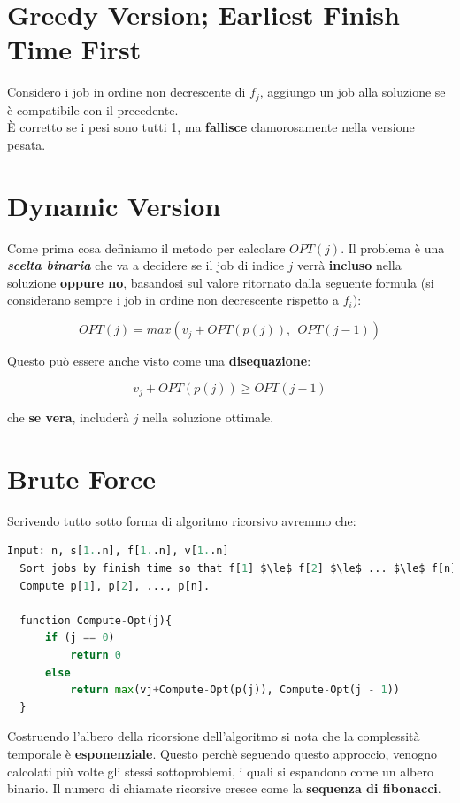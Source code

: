 \section{Greedy Version; Earliest Finish Time First}

Considero i job in ordine non decrescente di $f_j$, aggiungo un job
alla soluzione se è compatibile con il precedente.\\
È corretto se i pesi sono tutti 1, ma \textbf{fallisce} clamorosamente
nella versione pesata.

\section{Dynamic Version}

Come prima cosa definiamo il metodo per calcolare $OPT(j)$. Il
problema è una \textbf{\emph{scelta binaria}} che va a decidere se il
job di indice $j$ verrà \textbf{incluso} nella soluzione
\textbf{oppure no}, basandosi sul valore ritornato dalla seguente
formula (si considerano sempre i job in ordine non decrescente rispetto
a $f_i$):

$$
      OPT(j) = max(v_j + OPT(p(j)), \ \ OPT(j-1))
$$

Questo può essere anche visto come una \textbf{disequazione}:

$$
      v_j + OPT(p(j)) \geq OPT(j-1)
$$

che \textbf{se vera}, includerà $j$ nella soluzione ottimale.


\section{Brute Force}

Scrivendo tutto sotto forma di algoritmo ricorsivo avremmo che:

\begin{lstlisting}[language=Python, mathescape=true]
  Input: n, s[1..n], f[1..n], v[1..n]
  Sort jobs by finish time so that f[1] $\le$ f[2] $\le$ ... $\le$ f[n]. 
  Compute p[1], p[2], ..., p[n].
  
  function Compute-Opt(j){
      if (j == 0)
          return 0
      else
          return max(vj+Compute-Opt(p(j)), Compute-Opt(j - 1))
  }
\end{lstlisting}

Costruendo l'albero della ricorsione dell'algoritmo si nota che la
complessità temporale è \textbf{esponenziale}. Questo perchè seguendo
questo approccio, venogno calcolati più volte gli stessi sottoproblemi,
i quali si espandono come un albero binario. Il numero di chiamate
ricorsive cresce come la \textbf{sequenza di fibonacci}.

